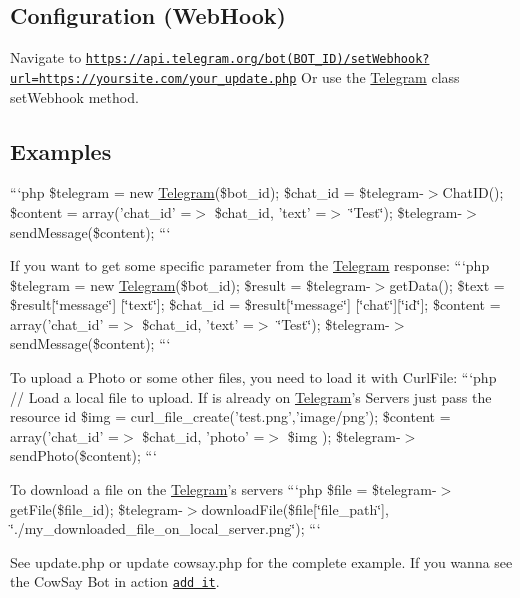 \subsection*{Configuration (Web\-Hook) }

Navigate to \href{https://api.telegram.org/bot(BOT_ID)/setWebhook?url=https://yoursite.com/your_update.php}{\tt https\-://api.\-telegram.\-org/bot(\-B\-O\-T\-\_\-\-I\-D)/set\-Webhook?url=https\-://yoursite.\-com/your\-\_\-update.\-php} Or use the \hyperlink{class_telegram}{Telegram} class set\-Webhook method.

\subsection*{Examples }

```php \$telegram = new \hyperlink{class_telegram}{Telegram}(\$bot\-\_\-id); \$chat\-\_\-id = \$telegram-\/$>$Chat\-I\-D(); \$content = array('chat\-\_\-id' =$>$ \$chat\-\_\-id, 'text' =$>$ \char`\"{}\-Test\char`\"{}); \$telegram-\/$>$send\-Message(\$content); ```

If you want to get some specific parameter from the \hyperlink{class_telegram}{Telegram} response\-: ```php \$telegram = new \hyperlink{class_telegram}{Telegram}(\$bot\-\_\-id); \$result = \$telegram-\/$>$get\-Data(); \$text = \$result\mbox{[}\char`\"{}message\char`\"{}\mbox{]} \mbox{[}\char`\"{}text\char`\"{}\mbox{]}; \$chat\-\_\-id = \$result\mbox{[}\char`\"{}message\char`\"{}\mbox{]} \mbox{[}\char`\"{}chat\char`\"{}\mbox{]}\mbox{[}\char`\"{}id\char`\"{}\mbox{]}; \$content = array('chat\-\_\-id' =$>$ \$chat\-\_\-id, 'text' =$>$ \char`\"{}\-Test\char`\"{}); \$telegram-\/$>$send\-Message(\$content); ```

To upload a Photo or some other files, you need to load it with Curl\-File\-: ```php // Load a local file to upload. If is already on \hyperlink{class_telegram}{Telegram}'s Servers just pass the resource id \$img = curl\-\_\-file\-\_\-create('test.\-png','image/png'); \$content = array('chat\-\_\-id' =$>$ \$chat\-\_\-id, 'photo' =$>$ \$img ); \$telegram-\/$>$send\-Photo(\$content); ```

To download a file on the \hyperlink{class_telegram}{Telegram}'s servers ```php \$file = \$telegram-\/$>$get\-File(\$file\-\_\-id); \$telegram-\/$>$download\-File(\$file\mbox{[}\char`\"{}file\-\_\-path\char`\"{}\mbox{]}, \char`\"{}./my\-\_\-downloaded\-\_\-file\-\_\-on\-\_\-local\-\_\-server.\-png\char`\"{}); ```

See update.\-php or update cowsay.\-php for the complete example. If you wanna see the Cow\-Say Bot in action \href{https://telegram.me/cowmooobot}{\tt add it}.

